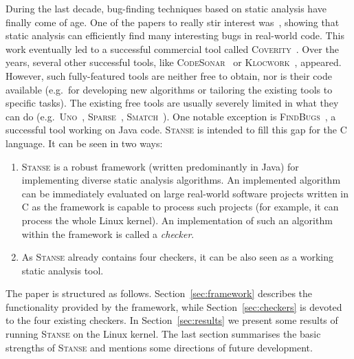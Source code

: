\documentclass{llncs}
\newcommand\Color[2]{\textcolor{#1}{#2}}
\newcommand{\nb}[1]{\marginpar{\scriptsize #1}}
\newcommand\todo[1]{\nb{\Color{red}{#1}}}
\newcommand{\Stanse}{\textsc{Stanse}\xspace}
\newcommand{\MT}[1]{{\color{blue} #1}}
\renewcommand{\MT}[1]{{#1}}
\begin{document}
During the last decade, bug-finding techniques based on static analysis have
finally come of age. One of the papers to really stir interest
was~\cite{ECCH00}, showing that static analysis can efficiently find many
interesting bugs in real-world code.  This work eventually led to a
successful commercial tool called \textsc{Coverity}~\cite{coverity}. Over the
years, several other successful tools, like
\textsc{CodeSonar}~\cite{codesonar} or \textsc{Klocwork}~\cite{klocwork},
appeared.
%
However, such fully-featured tools are neither free to obtain, nor is their
code available (e.g.~for developing new algorithms or tailoring the existing
tools to specific tasks). The existing free tools are usually severely
limited in what they can do (e.g.~\textsc{Uno}~\cite{uno},
\textsc{Sparse}~\cite{sparse}, \textsc{Smatch}~\cite{smatch}). One notable
exception is \textsc{FindBugs}~\cite{HP04,findbugs}, a successful tool
working on Java code. \Stanse is intended to fill this gap for the C language. It
can be seen in two ways:
\begin{enumerate}
\item \Stanse is a robust framework (written predominantly in Java) for
  implementing diverse static analysis algorithms. An implemented algorithm
  can be immediately evaluated on large real-world software projects written
  in C as the framework is capable to process such projects (for example, it
  can process the whole Linux kernel). An implementation of such an algorithm
  within the framework is called a \emph{checker}.

  \item As \Stanse already contains four checkers, it can be also seen as a
  working static analysis tool.
\end{enumerate}


The paper is structured as follows. Section~\ref{sec:framework}
describes the functionality provided by the framework, while
Section~\ref{sec:checkers} is devoted to the four existing checkers.
In Section~\ref{sec:results} we present some results of running \Stanse on the Linux
kernel. The last section summarises the basic strengths of \Stanse and
mentions some directions of future development.
\end{document}
